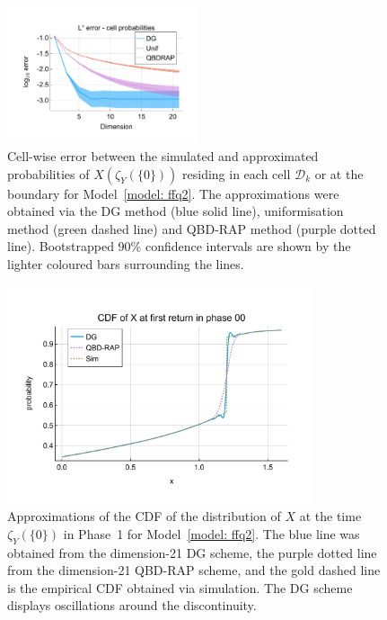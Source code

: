 \begin{figure}[h]
	\centering
	\includegraphics[width=0.5\textwidth,trim={0.75cm 0.8cm 0.25cm 1.25cm},clip]{chapter6/figs/ffq/discts/l1_cell_probs_error_formatted.pdf}%
	\caption{Cell-wise error between the simulated and approximated probabilities of \(X(\zeta_{Y}(\{0\}))\) residing in each cell \(\mathcal D_k\) or at the boundary for Model~\ref{model: ffq2}. The approximations were obtained via the DG method (blue solid line), uniformisation method (green dashed line) and QBD-RAP method (purple dotted line). Bootstrapped 90\% confidence intervals are shown by the lighter coloured bars surrounding the lines.} 
	\label{fig: ffq2 cell probs} 
\end{figure}
\begin{figure}[h] 
	\centering
	\includegraphics[width=0.8\textwidth,trim={0cm 1.25cm 0cm 1.25cm},clip]{chapter6/figs/ffq/discts/phase_4_cdf.pdf}%
	\caption{Approximations of the CDF of the distribution of \(X\) at the time \(\zeta_Y(\{0\})\) in Phase~1 for Model~\ref{model: ffq2}. The blue line was obtained from the dimension-21 DG scheme, the purple dotted line from the dimension-21 QBD-RAP scheme, and the gold dashed line is the empirical CDF obtained via simulation. The DG scheme displays oscillations around the discontinuity. } 
	\label{fig: ffq2 oscillation} 
\end{figure}
\FloatBarrier


